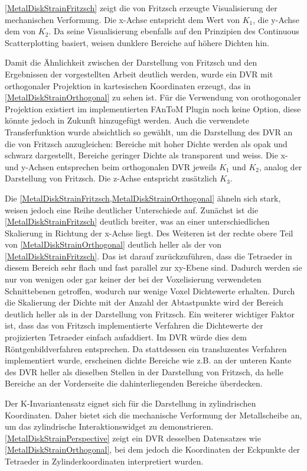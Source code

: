 \documentclass[a4paper,fontsize=12pt,toc=bib,parskip=half,ngerman]{scrartcl}
\begin{document}
\cref{MetalDiskStrainFritzsch} zeigt die von Fritzsch erzeugte Visualisierung der mechanischen Verformung. Die x-Achse entspricht dem Wert von $K_1$, die y-Achse dem von $K_2$. Da seine Visualisierung ebenfalls auf den Prinzipien des Continuous Scatterplotting basiert, weisen dunklere Bereiche auf h\"ohere Dichten hin.

Damit die \"Ahnlichkeit zwischen der Darstellung von Fritzsch und den Ergebnissen der vorgestellten Arbeit deutlich werden, wurde ein DVR mit orthogonaler Projektion in kartesischen Koordinaten erzeugt, das in \cref{MetalDiskStrainOrthogonal} zu sehen ist. F\"ur die Verwendung von orothogonaler Projektion existiert im implementierten FAnToM Plugin noch keine Option, diese k\"onnte jedoch in Zukunft hinzugef\"ugt werden. Auch die verwendete Transferfunktion wurde absichtlich so gew\"ahlt, um die Darstellung des DVR an die von Fritzsch anzugleichen: Bereiche mit hoher Dichte werden als opak und schwarz dargestellt, Bereiche geringer Dichte als transparent und weiss. Die x- und y-Achsen entsprechen beim orthogonalen DVR jeweils $K_1$ und $K_2$, analog der Darstellung von Fritzsch. Die z-Achse entspricht zus\"atzlich $K_3$.

Die \cref{MetalDiskStrainFritzsch,MetalDiskStrainOrthogonal} \"ahneln sich stark, weisen jedoch eine Reihe deutlicher Unterschiede auf. Zun\"achst ist die \cref{MetalDiskStrainFritzsch} deutlich breiter, was an einer unterschiedlichen Skalierung in Richtung der x-Achse liegt. Des Weiteren ist der rechte obere Teil von \cref{MetalDiskStrainOrthogonal} deutlich heller als der von \cref{MetalDiskStrainFritzsch}. Das ist darauf zur\"uckzuf\"uhren, dass die Tetraeder in diesem Bereich sehr flach und fast parallel zur xy-Ebene sind. Dadurch werden sie nur von wenigen oder gar keiner der bei der Voxelisierung verwendeten Schnittebenen getroffen, wodurch nur wenige Voxel Dichtewerte erhalten. Durch die Skalierung der Dichte mit der Anzahl der Abtastpunkte wird der Bereich deutlich heller als in der Darstellung von Fritzsch. Ein weiterer wichtiger Faktor ist, dass das von Fritzsch implementierte Verfahren die Dichtewerte der projizierten Tetraeder einfach aufaddiert. Im DVR w\"urde dies dem R\"ontgenbildverfahren entsprechen. Da stattdessen ein transluzentes Verfahren implementiert wurde, erscheinen dichte Bereiche wie z.B. an der unteren Kante des DVR heller als dieselben Stellen in der Darstellung von Fritzsch, da helle Bereiche an der Vorderseite die dahinterliegenden Bereiche \"uberdecken.

Der K-Invariantensatz eignet sich f\"ur die Darstellung in zylindrischen Koordinaten. Daher bietet sich die mechanische Verformung der Metallscheibe an, um das zylindrische Interaktionswidget zu demonstrieren. \cref{MetalDiskStrainPerspective} zeigt ein DVR desselben Datensatzes wie \cref{MetalDiskStrainOrthogonal}, bei dem jedoch die Koordinaten der Eckpunkte der Tetraeder in Zylinderkoordinaten interpretiert wurden.
\end{document}
